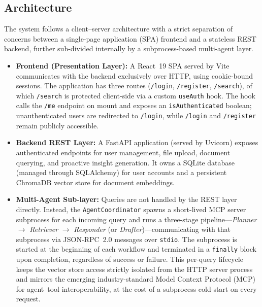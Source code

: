 \documentclass[11pt,a4paper]{article}
\begin{document}
\subsection{Architecture}

The system follows a client--server architecture with a strict separation of concerns between
a single-page application (SPA) frontend and a stateless REST backend, further sub-divided internally
by a subprocess-based multi-agent layer.

\begin{itemize}
    \item \textbf{Frontend (Presentation Layer):} A React~19 SPA served by Vite communicates
          with the backend exclusively over HTTP, using cookie-bound sessions.  The application
          has three routes (\texttt{/login}, \texttt{/register}, \texttt{/search}), of which
          \texttt{/search} is protected client-side via a custom \texttt{useAuth} hook.  The hook
          calls the \texttt{/me} endpoint on mount and exposes an \texttt{isAuthenticated} boolean;
          unauthenticated users are redirected to \texttt{/login}, while \texttt{/login} and
          \texttt{/register} remain publicly accessible.

    \item \textbf{Backend REST Layer:} A FastAPI application (served by Uvicorn) exposes authenticated
          endpoints for user management, file upload, document querying, and proactive insight
          generation.  It owns a SQLite database (managed through SQLAlchemy) for user accounts and
          a persistent ChromaDB vector store for document embeddings.

    \item \textbf{Multi-Agent Sub-layer:} Queries are not handled by the REST layer directly.
          Instead, the \texttt{AgentCoordinator} spawns a short-lived MCP server subprocess
          for each incoming query and runs a three-stage pipeline---\textit{Planner}
          $\rightarrow$ \textit{Retriever} $\rightarrow$ \textit{Responder} (or
          \textit{Drafter})---communicating with that subprocess via JSON-RPC~2.0 messages
          over \texttt{stdio}.  The subprocess is started at the beginning of each workflow
          and terminated in a \texttt{finally} block upon completion, regardless of success
          or failure.  This per-query lifecycle keeps the vector store access strictly
          isolated from the HTTP server process and mirrors the emerging industry-standard
          Model Context Protocol (MCP) for agent--tool interoperability, at the cost of a
          subprocess cold-start on every request.
\end{itemize}
\end{document}
